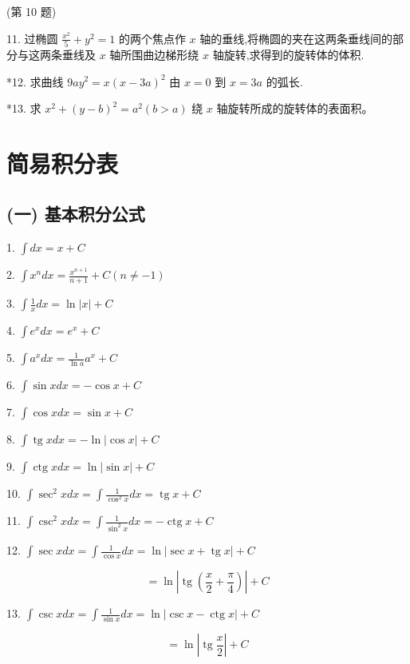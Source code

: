 \documentclass[lang=cn,newtx,10pt,scheme=chinese]{elegantbook}
\begin{document}
(第 10 题)

11. 过椭圆 \(\frac{{x}^{2}}{5} + {y}^{2} = 1\) 的两个焦点作 \(x\) 轴的垂线,将椭圆的夹在这两条垂线间的部分与这两条垂线及 \(x\) 轴所围曲边梯形绕 \(x\) 轴旋转,求得到的旋转体的体积.

*12. 求曲线 \({9a}{y}^{2} = x{\left( x - 3a\right) }^{2}\) 由 \(x = 0\) 到 \(x = {3a}\) 的弧长.

*13. 求 \({x}^{2} + {\left( y - b\right) }^{2} = {a}^{2}\left( {b > a}\right)\) 绕 \(x\) 轴旋转所成的旋转体的表面积。


\appendix

\chapter{简易积分表}

\section*{(一) 基本积分公式}

1. \(\int {dx} = x + C\)

2. \(\int {x}^{n}{dx} = \frac{{x}^{n + 1}}{n + 1} + C\left( {n \neq - 1}\right)\)

3. \(\int \frac{1}{x}{dx} = \ln \left| x\right| + C\)

4. \(\int {e}^{x}{dx} = {e}^{x} + C\)

5. \(\int {a}^{x}{dx} = \frac{1}{\ln a}{a}^{x} + C\)

6. \(\int \sin {xdx} = - \cos x + C\)

7. \(\int \cos {xdx} = \sin x + C\)

8. \(\int \operatorname{tg}{xdx} = - \ln \left| {\cos x}\right| + C\)

9. \(\int \operatorname{ctg}{xdx} = \ln \left| {\sin x}\right| + C\)

10. \(\int {\sec }^{2}{xdx} = \int \frac{1}{{\cos }^{2}x}{dx} = \operatorname{tg}x + C\)

11. \(\int {\csc }^{2}{xdx} = \int \frac{1}{{\sin }^{2}x}{dx} = - \operatorname{ctg}x + C\)

12. \(\int \sec {xdx} = \int \frac{1}{\cos x}{dx} = \ln \left| {\sec x + \operatorname{tg}x}\right| + C\)

\[
= \ln \left| {\operatorname{tg}\left( {\frac{x}{2} + \frac{\pi }{4}}\right) }\right| + C
\]

13. \(\int \csc {xdx} = \int \frac{1}{\sin x}{dx} = \ln \left| {\csc x - \operatorname{ctg}x}\right| + C\)

\[
= \ln \left| {\operatorname{tg}\frac{x}{2}}\right| + C
\]
\end{document}
